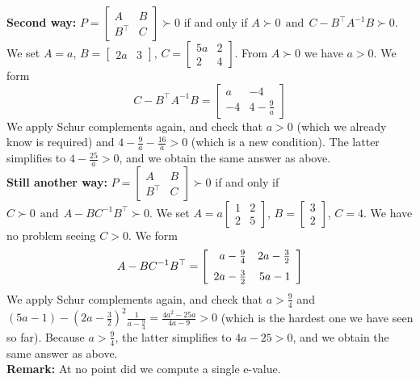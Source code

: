 \documentclass[letterpaper]{article}
\begin{document}
\begin{enumerate}
\textbf{Second way:}
$P = \left[\begin{array}{cc} A & B\\ B^\top & C \end{array}\right] \succ 0$ if and only if
$ A \succ 0~~  \text{and} ~~C-B^\top A^{-1} B \succ 0.$
We set $A=a$, $B=\left[ \begin{array}{cc} 2a & 3\end{array} \right] $, $C = \left[ \begin{array}{cc} 5a & 2\\ 2 & 4\end{array} \right]$. From $A \succ0$ we have $a>0$. We form 
$$C-B^\top A^{-1} B = \left[ \begin{array}{rr} a & -4 \\ -4 &4 - \frac{9}{a}\end{array} \right]$$
We apply Schur complements again, and check that
$a>0$ (which we already know is required) and $4 - \frac{9}{a} - \frac{16}{a} >0$ (which is a new condition). The latter simplifies to $4 - \frac{25}{a} >0$, and we obtain the same answer as above.\\

\textbf{Still another way:}
$P = \left[\begin{array}{cc} A & B\\ B^\top & C \end{array}\right] \succ 0$ if and only if
$ C \succ 0~~  \text{and} ~~A-BC^{-1} B^\top  \succ 0.$
We set $A= a\left[\begin{array}{cc} 1 & 2 \\ 2 & 5 \end{array} \right]$, $B=\left[ \begin{array}{c} 3 \\ 2 \end{array} \right] $, $C = 4$. We have no problem seeing $C>0$. 
We form
$$A-BC^{-1} B^\top  = \left[ \begin{array}{rr} a - \frac{9}{4} & 2 a - \frac{3}{2} \medskip \\ 2 a - \frac{3}{2} & 5 a - 1\end{array} \right]$$
We apply Schur complements again, and check that
$a>\frac{9}{4}$  and $(5a-1) - (2a - \frac{3}{2})^2 \frac{1}{ a - \frac{9}{4}} = \frac{4 a^2 - 25 a}{4 a - 9}>0$ (which is the hardest one we have seen so far). Because $a > \frac{9}{4}$, the  latter simplifies to $4a - 25 >0$, and we obtain the same answer as above.\\

\textbf{Remark:} At no point did we compute a single e-value.


\end{enumerate}
\end{document}
